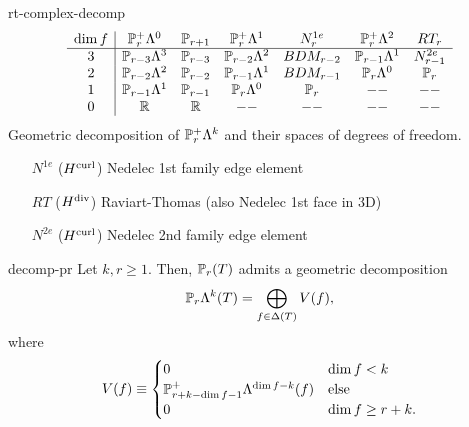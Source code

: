 \begin{Example}{rt-complex-decomp}
  \begin{gather}
    \begin{array}{c|cccccc}
      \dim f
      & \P_r^+\Lambda^0 & \P_{r+1}
      & \P_r^+\Lambda^1 & N^{1e}_r
      & \P_r^+\Lambda^2 & RT_r \\\hline
      3 & \P_{r-3}\Lambda^3 & \P_{r-3} & \P_{r-2}\Lambda^2 & BDM_{r-2} & \P_{r-1}\Lambda^1 & N^{2e}_{r-1} \\
      2 & \P_{r-2}\Lambda^2 & \P_{r-2} & \P_{r-1}\Lambda^1 & BDM_{r-1} & \P_{r}\Lambda^0 & \P_r\\
      1 & \P_{r-1}\Lambda^1 & \P_{r-1} & \P_{r}\Lambda^0   & \P_r  & -- & -- \\
      0 & \R & \R & -- & -- & --& --
    \end{array}
  \end{gather}
  Geometric decomposition of $\P_r^+\Lambda^k$ and their spaces of degrees of freedom.
  \begin{itemize}
  \item [$N^{1e}$] ($\Hcurl$) Nedelec 1st family edge element
  \item [$RT$] ($\Hdiv$) Raviart-Thomas (also Nedelec 1st face in 3D)
  \item [$N^{2e}$] ($\Hcurl$) Nedelec 2nd family edge element
  \end{itemize}
\end{Example}

\begin{Theorem}{decomp-pr}
  Let $k,r\ge 1$. Then, $\P_r(\cell)$ admits a geometric decomposition
  \begin{gather}
    \P_r\Lambda^k(\cell) = \bigoplus_{f\in\Delta(\cell)} V(f),
  \end{gather}
  where
  \begin{gather}
    V(f) \equiv
    \begin{cases}
      0 & \dim f < k\\
      \P_{r+k-\dim f-1}^+ \Lambda^{\dim f-k}(f) &\text{else}\\
      0 & \dim f \ge r+k.
    \end{cases}
  \end{gather}
\end{Theorem}

